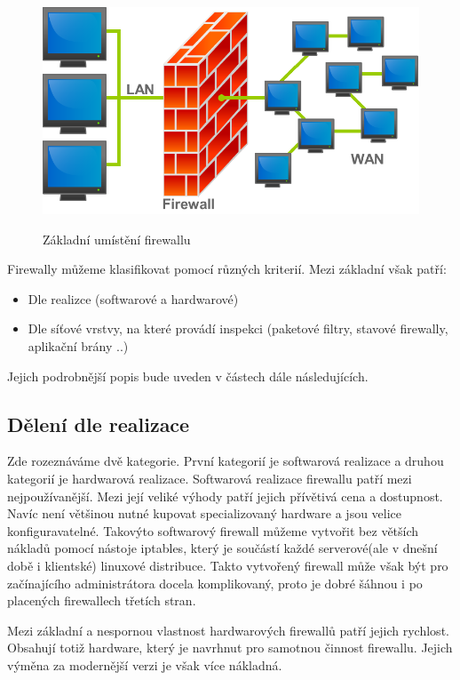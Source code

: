 \documentclass[11pt,a4paper]{article}
\begin{document}
\begin{figure}[ht]
	\center
	\includegraphics[scale=0.3]{./pict/firewall.png}
	\label{pic:firewall_base}
	\caption{Základní umístění firewallu \cite{ref:wiki_firewall}}
\end{figure}

Firewally můžeme klasifikovat pomocí různých kriterií. Mezi základní však patří:
\begin{itemize}
	\item Dle realizce (softwarové a hardwarové)
	\item Dle síťové vrstvy, na které provádí inspekci (paketové filtry, stavové firewally, aplikační brány ..)
\end{itemize} 

Jejich podrobnější popis bude uveden v částech dále následujících.

\subsection{Dělení dle realizace}
Zde rozeznáváme dvě kategorie. První kategorií je softwarová realizace a druhou kategorií je hardwarová realizace. Softwarová realizace firewallu patří mezi nejpoužívanější. Mezi její veliké výhody patří jejich přívětivá cena a dostupnost. Navíc není většinou nutné kupovat specializovaný hardware a jsou velice konfiguravatelné. Takovýto softwarový firewall můžeme vytvořit bez větších nákladů pomocí nástoje iptables, který je součástí každé serverové(ale v dnešní době i klientské) linuxové distribuce. Takto vytvořený firewall může však být pro začínajícího administrátora docela komplikovaný, proto je dobré šáhnou i po placených firewallech třetích stran.

Mezi základní a nespornou vlastnost hardwarových firewallů patří jejich rychlost. Obsahují totiž hardware, který je navrhnut pro samotnou činnost firewallu. Jejich výměna za modernější verzi je však více nákladná.
\end{document}
